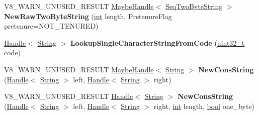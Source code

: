 \begin{DoxyCompactItemize}
\item 
\mbox{\label{classv8_1_1internal_1_1Factory_a15ab7fc8507bc7e1fd0ffe261578344d}} 
V8\+\_\+\+W\+A\+R\+N\+\_\+\+U\+N\+U\+S\+E\+D\+\_\+\+R\+E\+S\+U\+LT \mbox{\hyperlink{classv8_1_1internal_1_1MaybeHandle}{Maybe\+Handle}}$<$ \mbox{\hyperlink{classv8_1_1internal_1_1SeqTwoByteString}{Seq\+Two\+Byte\+String}} $>$ {\bfseries New\+Raw\+Two\+Byte\+String} (\mbox{\hyperlink{classint}{int}} length, Pretenure\+Flag pretenure=N\+O\+T\+\_\+\+T\+E\+N\+U\+R\+ED)
\item 
\mbox{\label{classv8_1_1internal_1_1Factory_a094f90af8e12110477d89af1489588f7}} 
\mbox{\hyperlink{classv8_1_1internal_1_1Handle}{Handle}}$<$ \mbox{\hyperlink{classv8_1_1internal_1_1String}{String}} $>$ {\bfseries Lookup\+Single\+Character\+String\+From\+Code} (\mbox{\hyperlink{classuint32__t}{uint32\+\_\+t}} code)
\item 
\mbox{\label{classv8_1_1internal_1_1Factory_ad5905f8e4fb889aa3fb5253dbe6344b6}} 
V8\+\_\+\+W\+A\+R\+N\+\_\+\+U\+N\+U\+S\+E\+D\+\_\+\+R\+E\+S\+U\+LT \mbox{\hyperlink{classv8_1_1internal_1_1MaybeHandle}{Maybe\+Handle}}$<$ \mbox{\hyperlink{classv8_1_1internal_1_1String}{String}} $>$ {\bfseries New\+Cons\+String} (\mbox{\hyperlink{classv8_1_1internal_1_1Handle}{Handle}}$<$ \mbox{\hyperlink{classv8_1_1internal_1_1String}{String}} $>$ left, \mbox{\hyperlink{classv8_1_1internal_1_1Handle}{Handle}}$<$ \mbox{\hyperlink{classv8_1_1internal_1_1String}{String}} $>$ right)
\item 
\mbox{\label{classv8_1_1internal_1_1Factory_a35af6068f92affb048893da535007ab5}} 
V8\+\_\+\+W\+A\+R\+N\+\_\+\+U\+N\+U\+S\+E\+D\+\_\+\+R\+E\+S\+U\+LT \mbox{\hyperlink{classv8_1_1internal_1_1Handle}{Handle}}$<$ \mbox{\hyperlink{classv8_1_1internal_1_1String}{String}} $>$ {\bfseries New\+Cons\+String} (\mbox{\hyperlink{classv8_1_1internal_1_1Handle}{Handle}}$<$ \mbox{\hyperlink{classv8_1_1internal_1_1String}{String}} $>$ left, \mbox{\hyperlink{classv8_1_1internal_1_1Handle}{Handle}}$<$ \mbox{\hyperlink{classv8_1_1internal_1_1String}{String}} $>$ right, \mbox{\hyperlink{classint}{int}} length, \mbox{\hyperlink{classbool}{bool}} one\+\_\+byte)
\item 
\mbox{\label{classv8_1_1internal_1_1Factory_a270c445f5a39c0f1303877ee4c64de53}} 

\end{DoxyCompactItemize}
